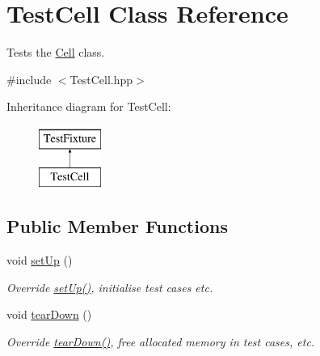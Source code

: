 \hypertarget{class_test_cell}{}\section{Test\+Cell Class Reference}
\label{class_test_cell}


Tests the \hyperlink{class_cell}{Cell} class.  




{\ttfamily \#include $<$Test\+Cell.\+hpp$>$}

Inheritance diagram for Test\+Cell\+:\begin{figure}[H]
\begin{center}
\leavevmode
\includegraphics[height=2.000000cm]{class_test_cell}
\end{center}
\end{figure}
\subsection*{Public Member Functions}
\begin{DoxyCompactItemize}
\item 
\mbox{\label{class_test_cell_a2b9eac7e600f08cff408df54562daa61}} 
void \hyperlink{class_test_cell_a2b9eac7e600f08cff408df54562daa61}{set\+Up} ()
\begin{DoxyCompactList}\small\item\em Override \hyperlink{class_test_cell_a2b9eac7e600f08cff408df54562daa61}{set\+Up()}, initialise test cases etc. \end{DoxyCompactList}\item 
\mbox{\label{class_test_cell_a2ecd29c5f60aa63425c590b6399c0db0}} 
void \hyperlink{class_test_cell_a2ecd29c5f60aa63425c590b6399c0db0}{tear\+Down} ()
\begin{DoxyCompactList}\small\item\em Override \hyperlink{class_test_cell_a2ecd29c5f60aa63425c590b6399c0db0}{tear\+Down()}, free allocated memory in test cases, etc. \end{DoxyCompactList}\end{DoxyCompactItemize}

